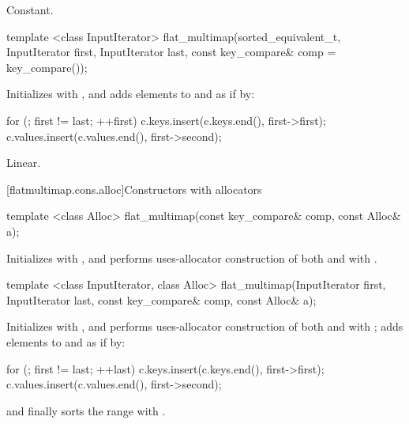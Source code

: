 \begin{codeblock}
\begin{codeblock}
\begin{codeblock}
\begin{addedblock}
\begin{itemdescr}
\pnum
\complexity
Constant.
\end{itemdescr}

%
\begin{itemdecl}
template <class InputIterator>
  flat_multimap(sorted_equivalent_t, InputIterator first, InputIterator last,
                const key_compare& comp = key_compare());
\end{itemdecl}

\begin{itemdescr}
\pnum
\effects Initializes  with
, and adds elements to  and  as if by:
\begin{codeblock}
for (; first != last; ++first) {
  c.keys.insert(c.keys.end(), first->first);
  c.values.insert(c.values.end(), first->second);
}
\end{codeblock}

\pnum
\complexity
Linear.
\end{itemdescr}

[flatmultimap.cons.alloc]{Constructors with allocators}

%
\begin{itemdecl}
template <class Alloc>
  flat_multimap(const key_compare& comp, const Alloc& a);
\end{itemdecl}

\begin{itemdescr}
\pnum
\effects Initializes  with , and performs
uses-allocator construction of both
 and  with .
\end{itemdescr}

%
\begin{itemdecl}
template <class InputIterator, class Alloc>
  flat_multimap(InputIterator first, InputIterator last,
                const key_compare& comp, const Alloc& a);
\end{itemdecl}

\begin{itemdescr}
\pnum
\effects Initializes  with , and performs
uses-allocator construction of both
 and  with ; adds elements to
 and  as if by:
\begin{codeblock}
for (; first != last; ++last) {
  c.keys.insert(c.keys.end(), first->first);
  c.values.insert(c.values.end(), first->second);
}
\end{codeblock}
and finally sorts the range  with .
\end{itemdescr}


\end{addedblock}
\end{codeblock}
\end{codeblock}
\end{codeblock}

